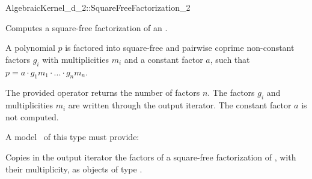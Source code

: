 \begin{ccRefConcept}{AlgebraicKernel_d_2::SquareFreeFactorization_2}

\ccDefinition
Computes a square-free factorization of an
.

A polynomial $p$ is factored into square-free and pairwise 
coprime non-constant factors $g_i$ with multiplicities $m_i$ 
and a constant factor $a$, such that 
$p = a  \cdot  g_1m_1  \cdot  ...  \cdot  g_nm_n$.

The provided operator returns the number of factors $n$.
The factors $g_i$ and multiplicities $m_i$ are written through the 
output iterator. 
The constant factor $a$ is not computed. 

\ccRefines 
{} 

\ccOperations
{}

A model \ccVar\ of this type must provide:

{Copies in the output iterator the factors of a square-free 
factorization of , with their multiplicity, as objects of type 
.}

\ccSeeAlso

\end{ccRefConcept}
